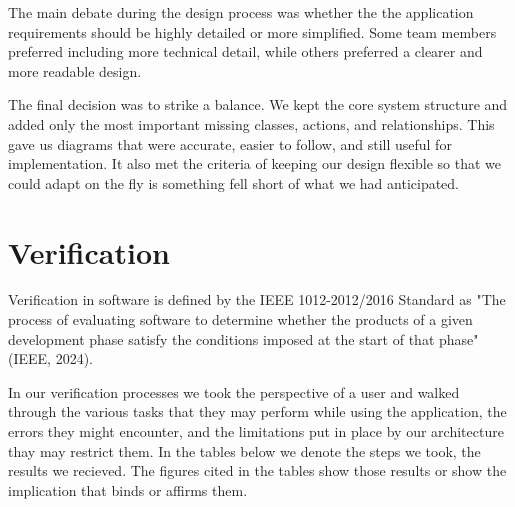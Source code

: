 \documentclass[12pt]{article}
\begin{document}
The main debate during the design process was whether the the application requirements should be highly detailed or more simplified. Some team members preferred including more technical detail, while others preferred a clearer and more readable design.

The final decision was to strike a balance. We kept the core system structure and added only the most important missing classes, actions, and relationships. This gave us diagrams that were accurate, easier to follow, and still useful for implementation. It also met the criteria of keeping our design flexible so that we could adapt on the fly is something fell short of what we had anticipated.

\newpage
\section{Verification}
Verification in software is defined by the IEEE 1012-2012/2016 Standard as "The process of evaluating software to determine whether the products of a given development phase satisfy the conditions imposed at the start of that phase"(IEEE, 2024).

In our verification processes we took the perspective of a user and walked through the various tasks that they may perform while using the application, the errors they might encounter, and the limitations put in place by our architecture thay may restrict them. In the tables below we denote the steps we took, the results we recieved. The figures cited in the tables show those results or show the implication that binds or affirms them. 

\end{document}
